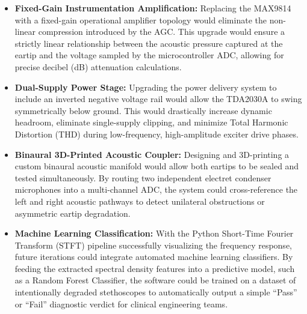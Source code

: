 \begin{itemize}
    \item \textbf{Fixed-Gain Instrumentation Amplification:} Replacing the MAX9814 with a fixed-gain operational amplifier topology would eliminate the non-linear compression introduced by the AGC. This upgrade would ensure a strictly linear relationship between the acoustic pressure captured at the eartip and the voltage sampled by the microcontroller ADC, allowing for precise decibel (dB) attenuation calculations.
    \item \textbf{Dual-Supply Power Stage:} Upgrading the power delivery system to include an inverted negative voltage rail would allow the TDA2030A to swing symmetrically below ground. This would drastically increase dynamic headroom, eliminate single-supply clipping, and minimize Total Harmonic Distortion (THD) during low-frequency, high-amplitude exciter drive phases.
    \item \textbf{Binaural 3D-Printed Acoustic Coupler:} Designing and 3D-printing a custom binaural acoustic manifold would allow both eartips to be sealed and tested simultaneously. By routing two independent electret condenser microphones into a multi-channel ADC, the system could cross-reference the left and right acoustic pathways to detect unilateral obstructions or asymmetric eartip degradation.
    \item \textbf{Machine Learning Classification:} With the Python Short-Time Fourier Transform (STFT) pipeline successfully visualizing the frequency response, future iterations could integrate automated machine learning classifiers. By feeding the extracted spectral density features into a predictive model, such as a Random Forest Classifier, the software could be trained on a dataset of intentionally degraded stethoscopes to automatically output a simple ``Pass'' or ``Fail'' diagnostic verdict for clinical engineering teams.
\end{itemize}
